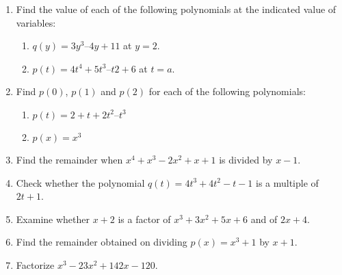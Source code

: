 \renewcommand{\theequation}{\theenumi}
\begin{enumerate}[label=\arabic*.,ref=\thesubsection.\theenumi]
%
\item Find the value of each of the following polynomials at the indicated value of variables: 
\begin{enumerate}
\item  $q(y) = 3y^3 – 4y + 11$ at $y = 2. $
\item  $p(t) = 4t^4+ 5t^3 – t2 + 6$ at $t = a.$
\end{enumerate}
%
\item Find $p(0)$, $p(1)$ and $p(2)$ for each of the following polynomials: 
\begin{enumerate}
\item  $p(t) = 2 + t + 2t^2 – t^3 $
\item $ p(x) = x^3$
\end{enumerate}
%
\item Find the remainder when $x^4+x^3-2x^2+x+1$ is divided by $x-1$.
%
\item Check whether the polynomial $q(t) = 4t^3+4t^2-t-1$ is a multiple of $2t+1$.
\item Examine whether $x + 2$ is a factor of $x^3 + 3x^2 + 5x + 6$ and of $2x + 4$.
\item Find the remainder obtained on dividing $p(x) = x^3+1 $ by $x+1$.
\item Factorize $x^3 - 23x^2 + 142x -120$.

\end{enumerate}
